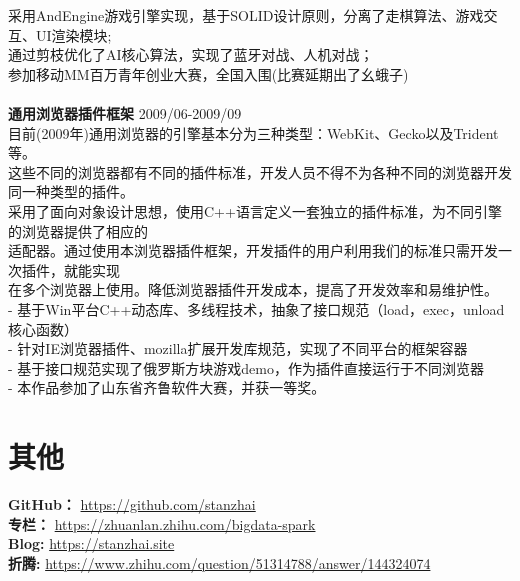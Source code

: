 \documentclass[UTF8,margin,line]{res}
\begin{document}
\begin{resume}
采用AndEngine游戏引擎实现，基于SOLID设计原则，分离了走棋算法、游戏交互、UI渲染模块; \\
通过剪枝优化了AI核心算法，实现了蓝牙对战、人机对战； \\
参加移动MM百万青年创业大赛，全国入围(比赛延期出了幺蛾子) \\
\\
\textbf{通用浏览器插件框架}  2009/06-2009/09 \\
目前(2009年)通用浏览器的引擎基本分为三种类型：WebKit、Gecko以及Trident等。 \\
这些不同的浏览器都有不同的插件标准，开发人员不得不为各种不同的浏览器开发同一种类型的插件。 \\
采用了面向对象设计思想，使用C++语言定义一套独立的插件标准，为不同引擎的浏览器提供了相应的 \\
适配器。通过使用本浏览器插件框架，开发插件的用户利用我们的标准只需开发一次插件，就能实现 \\
在多个浏览器上使用。降低浏览器插件开发成本，提高了开发效率和易维护性。 \\
- 基于Win平台C++动态库、多线程技术，抽象了接口规范（load，exec，unload核心函数） \\
- 针对IE浏览器插件、mozilla扩展开发库规范，实现了不同平台的框架容器 \\
- 基于接口规范实现了俄罗斯方块游戏demo，作为插件直接运行于不同浏览器 \\
- 本作品参加了山东省齐鲁软件大赛，并获一等奖。 \\

\section{\sc 其他}
\textbf{GitHub：} \url{https://github.com/stanzhai} \\
\textbf{专栏：} \url{https://zhuanlan.zhihu.com/bigdata-spark} \\
\textbf{Blog: } \url{https://stanzhai.site} \\
\textbf{折腾: } \url{https://www.zhihu.com/question/51314788/answer/144324074} \\

\end{resume}
\end{document}
